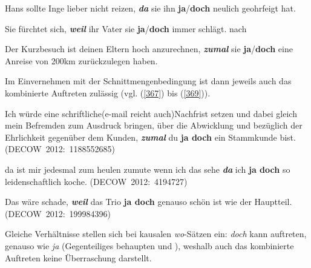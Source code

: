 \begin{exe}
	\ex\label{364} 
	Hans sollte Inge lieber nicht reizen, \textit{\textbf{da}} sie ihn \textbf{ja}/\textbf{doch} neulich geohrfeigt hat.
\end{exe}
\vspace{-0.65cm}	
\begin{exe}
	\ex\label{365} 
	Sie fürchtet sich, \textit{\textbf{weil}} ihr Vater sie \textbf{ja}/\textbf{doch} immer schlägt.
	\newline
	\hbox{}\hfill\hbox {nach \citet[77/81]{Borst1985}}
\end{exe}
\vspace{-0.65cm}
\begin{exe}
	\ex\label{366} 
	Der Kurzbesuch ist deinen Eltern hoch anzurechnen, \textit{\textbf{zumal}} sie \textbf{ja}/\textbf{doch} eine Anreise von 200km zurückzulegen haben.
\end{exe}
Im Einvernehmen mit der Schnittmengenbedingung ist dann jeweils auch das kombinierte Auftreten zulässig (vgl. (\ref{367}) bis (\ref{369})).

\begin{exe}
	\ex\label{367} 
	\scriptsize
	Ich würde eine schriftliche(e-mail reicht auch)Nachfrist setzen und dabei gleich mein Befremden zum Ausdruck bringen, über die Abwicklung und 				bezüglich der Ehrlichkeit gegenüber dem Kunden, \textbf{\textit{zumal}} du \textbf{ja doch} ein Stammkunde bist.
	\hfill\hbox {(DECOW 2012: 1188552685)}
\end{exe}
\vspace{-0.65cm}
\begin{exe}
	\ex\label{368} 
	da ist mir jedesmal zum heulen zumute wenn ich das sehe \textbf{\textit{da}} ich \textbf{ja doch} so leidenschaftlich koche.	
	\hfill\hbox {(DECOW 2012: 4194727)}
\end{exe}									                                 
\vspace{-0.65cm}
\begin{exe}
	\ex\label{369} 
	Das wäre schade, \textbf{\textit{weil}} das Trio \textbf{ja doch} genauso schön ist wie der Hauptteil.	
	\newline
	\hbox{}\hfill\hbox {(DECOW 2012: 199984396)}
\end{exe}		                                       
Gleiche Verhältnisse stellen sich bei kausalen \textit{wo}-Sätzen ein: \textit{doch} kann auftreten, genauso wie \textit{ja} (Gegenteiliges behaupten \citealt[63]{Thurmair1989} und \citealt[213]{Rinas2006}), weshalb auch das kombinierte Auftreten keine Überraschung darstellt.

